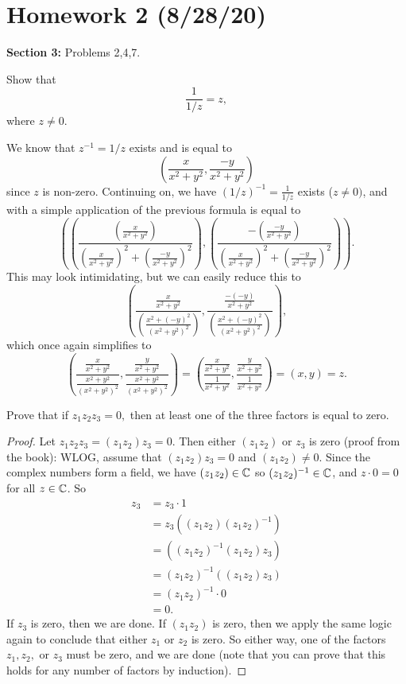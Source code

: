 \section*{Homework 2 (8/28/20)}
\textbf{Section 3:} Problems 2,4,7.
\begin{problem}[Question 2]
    Show that \[
    \frac{1}{1/z}=z,
    \]
    where $z \neq 0.$
\end{problem}
\begin{solution}
    We know that $z^{-1}=1/z$ exists and is equal to 
    \[
        \left( \frac{x}{x^2+y^2},\frac{-y}{x^2+y^2} \right) 
    \]
    since $z$ is non-zero. Continuing on, we have $(1/z)^{-1}=\frac{1}{1/z}$ exists ($z \neq 0)$, and with a simple application of the previous formula is equal to
    \[
        \left( \left( \frac{\left( \frac{x}{x^2+y^2} \right) }{ \left( \frac{x}{x^2+y^2} \right)^2 + \left( \frac{-y}{x^2+y^2} \right)^2 } \right), \left( \frac{-\left( \frac{-y}{x^2+y^2} \right) }{\left( \frac{x}{x^2+y^2} \right)^2 + \left( \frac{-y}{x^2+y^2} \right) ^2} \right) \right).
    \]  
   This may look intimidating, but we can easily reduce this to 
   \[
       \left( \frac{\frac{x}{x^2+y^2}}{\left( \frac{x^2+(-y)^2}{\left( x^2+y^2 \right) ^2} \right) }, \frac{\frac{-(-y)}{x^2+y^2}}{\left( \frac{x^2+(-y)^2}{\left( x^2+y^2 \right) ^2} \right) } \right),
   \]
   which once again simplifies to
    \[
        \left( \frac{\frac{x}{x^2+y^2}}{\frac{x^2+y^2}{\left( x^2+y^2 \right) ^2}}, \frac{\frac{y}{x^2+y^2}}{\frac{x^2+y^2}{\left( x^2+y^2 \right) ^2}}\right) = \left( \frac{\frac{x}{x^2+y^2}}{\frac{1}{x^2+y^2}}, \frac{\frac{y}{x^2+y^2}}{\frac{1}{x^2+y^2}} \right) = (x,y) = z.
    \]
\end{solution}
    
\begin{problem}[Question 4]
    Prove that if $z_1z_2z_3=0,$ then at least one of the three factors is equal to zero.
\end{problem}
\begin{proof}
    Let $z_1z_2z_3=(z_1z_2)z_3=0.$ Then either $(z_1z_2)$ or $z_3$ is zero (proof from the book): WLOG, assume that  $(z_1z_2)z_3=0$ and $(z_1z_2) \neq 0$. Since the complex numbers form a field, we have $(z_1z_2) \in \mathbb{C}$ so $(z_1z_2)^{-1} \in \mathbb{C}$, and $z\cdot0 =0$ for all $z \in \mathbb{C}$. So
        \begin{align*}
            z_3&=z_3\cdot1\\
               &=z_3\left( (z_1z_2)(z_1z_2)^{-1} \right) \\
               &= \left( (z_1z_2)^{-1}(z_1z_2)z_3 \right) \\
               &= (z_1z_2)^{-1}\left( (z_1z_2)z_3 \right) \\
               &= (z_1z_2)^{-1}\cdot0\\
               &=0.
        \end{align*}
        If $z_3$ is zero, then we are done. If $(z_1z_2)$ is zero, then we apply the same logic again to conclude that either $z_1$ or $z_2$ is zero. So either way, one of the factors $z_1,z_2,$ or $z_3$ must be zero, and we are done (note that you can prove that this holds for any number of factors by induction).
\end{proof}

